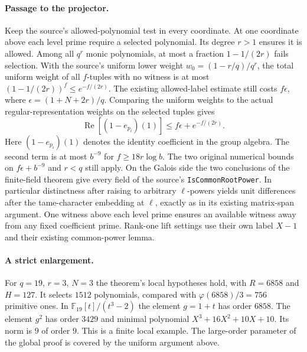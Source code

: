 \paragraph{Passage to the projector.}
Keep the source's allowed-polynomial test in every coordinate. At one coordinate above each level prime require a selected polynomial. Its degree $r>1$ ensures it is allowed. Among all $q^r$ monic polynomials, at most a fraction $1-1/(2r)$ fails selection. With the source's uniform lower weight $w_0=(1-r/q)/q^r$, the total uniform weight of all $f$-tuples with no witness is at most $(1-1/(2r))^f\le e^{-f/(2r)}$. The existing allowed-label estimate still costs $f\epsilon$, where $\epsilon=(1+N+2r)/q$. Comparing the uniform weights to the actual regular-representation weights on the selected tuples gives
\[
 \operatorname{Re}[(1-e_{p_i})(1)]\le f\epsilon+e^{-f/(2r)}.
\]
Here $(1-e_{p_i})(1)$ denotes the identity coefficient in the group algebra. The second term is at most $b^{-9}$ for $f\ge18r\log b$. The two original numerical bounds on $f\epsilon+b^{-9}$ and $r<q$ still apply. On the Galois side the two conclusions of the finite-field theorem give every field of the source's \texttt{IsCommonRootPower}. In particular distinctness after raising to arbitrary $\ell$-powers yields unit differences after the tame-character embedding at $\ell$, exactly as in its existing matrix-span argument. One witness above each level prime ensures an available witness away from any fixed coefficient prime. Rank-one lift settings use their own label $X-1$ and their existing common-power lemma.

\paragraph{A strict enlargement.}
For $q=19$, $r=3$, $N=3$ the theorem's local hypotheses hold, with $R=6858$ and $H=127$. It selects $1512$ polynomials, compared with $\varphi(6858)/3=756$ primitive ones. In $\mathbb F_{19}[t]/(t^3-2)$ the element $g=1+t$ has order $6858$. The element $g^2$ has order $3429$ and minimal polynomial $X^3+16X^2+10X+10$. Its norm is $9$ of order $9$. This is a finite local example. The large-order parameter of the global proof is covered by the uniform argument above.

